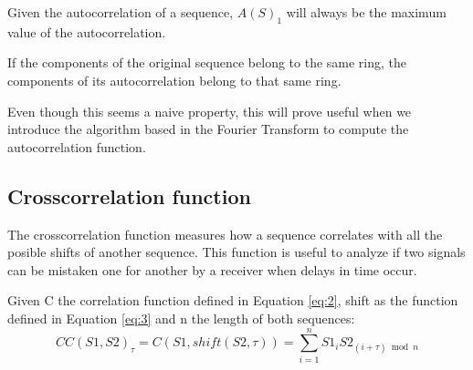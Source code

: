 \begin{corollary}\label{autocorrelation:coro:1}
  Given the autocorrelation of a sequence, $A(S)_{1}$ will always be the
  maximum value of the autocorrelation.
\end{corollary}

\begin{property}\label{autocorrelation:prop:1}

  If the components of the original sequence belong to the same ring, the
  components of its autocorrelation belong to that same ring.

\end{property}

Even though this seems a naive property, this will prove
useful when we introduce the algorithm based in the Fourier Transform to
compute the autocorrelation function.









\subsection{Crosscorrelation function}

The crosscorrelation function measures how a sequence correlates with all
the posible shifts of another sequence. This function is useful to analyze if two
signals can be mistaken one for another by a receiver when delays in time occur.


\begin{definition}[Crosscorrelation]\label{def:4}
  Given C the correlation function defined in Equation \eqref{eq:2}, shift as the function defined in Equation \eqref{eq:3} and n the length of both sequences:
  \begin{equation}\label{eq:7}
    CC(S1, S2)_{\tau} = C(S1, shift(S2, \tau)) = \sum_{i=1}^{n}S1_{i}S2_{(i+\tau) \bmod n}
  \end{equation}
\end{definition}

